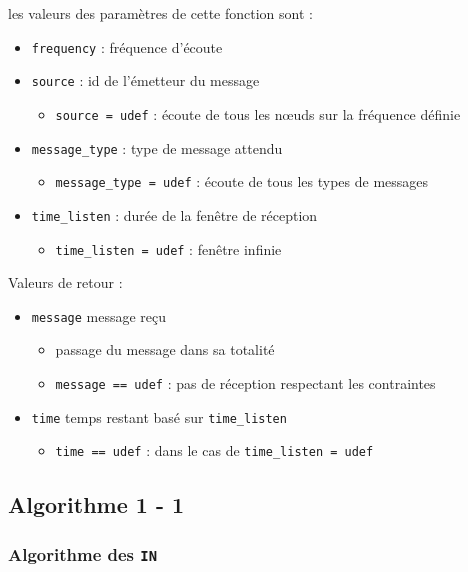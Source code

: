\documentclass[11pt]{article}
\begin{document}
les valeurs des paramètres de cette fonction sont :
\begin{itemize}
  \item \texttt{frequency} : fréquence d'écoute
  \item \texttt{source} : id de l'émetteur du message
  \begin{itemize}
    \item \texttt{source = udef} : écoute de tous les n{\oe}uds sur la fréquence définie
  \end{itemize}
  \item \texttt{message\_type} : type de message attendu
  \begin{itemize}
    \item \texttt{message\_type = udef} : écoute de tous les types de messages
  \end{itemize}
  \item \texttt{time\_listen} : durée de la fenêtre de réception
  \begin{itemize}
    \item \texttt{time\_listen = udef} : fenêtre infinie
  \end{itemize}
\end{itemize}

Valeurs de retour :

\begin{itemize}
  \item \texttt{message} message reçu
  \begin{itemize}
    \item passage du message dans sa totalité
    \item \texttt{message == udef} : pas de réception respectant les contraintes
  \end{itemize}
  \item \texttt{time} temps restant basé sur \texttt{time\_listen}
  \begin{itemize}
    \item \texttt{time == udef} : dans le cas de \texttt{time\_listen = udef}
  \end{itemize}
\end{itemize}

\subsection{Algorithme 1 - 1}

\subsubsection{Algorithme des \texttt{IN}}
\end{document}
